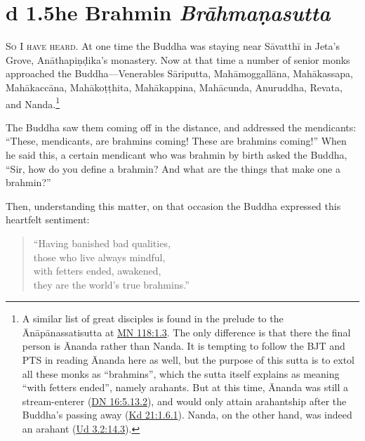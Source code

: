 \documentclass[12pt,openany]{book}%
\newcommand*{\suttatitleacronym}[1]{\smaller[2]{#1}\vspace*{.3em}}
\newcommand*{\suttatitletranslation}[1]{\linebreak{#1}}
\newcommand*{\suttatitleroot}[1]{\linebreak\smaller[2]\itshape{#1}}
\newcommand*{\tocacronym}[1]{\hspace*{-3.3em}{#1}\quad}
\newcommand*{\toctranslation}[1]{#1}
\newcommand*{\tocroot}[1]{(\textit{#1})}
\newcommand*{\scevam}[1]{\textsc{#1}}
\begin{document}
%
\section*{{\suttatitleacronym Ud 1.5}{\suttatitletranslation The Brahmin }{\suttatitleroot Brāhmaṇasutta}}
\addcontentsline{toc}{section}{\tocacronym{Ud 1.5} \toctranslation{The Brahmin } \tocroot{Brāhmaṇasutta}}

\scevam{So I have heard. }At one time the Buddha was staying near \textsanskrit{Sāvatthī} in Jeta’s Grove, \textsanskrit{Anāthapiṇḍika}’s monastery. Now at that time a number of senior monks approached the Buddha—Venerables \textsanskrit{Sāriputta}, \textsanskrit{Mahāmoggallāna}, \textsanskrit{Mahākassapa}, \textsanskrit{Mahākaccāna}, \textsanskrit{Mahākoṭṭhita}, \textsanskrit{Mahākappina}, \textsanskrit{Mahācunda}, Anuruddha, Revata, and Nanda.\footnote{A similar list of great disciples is found in the prelude to the \textsanskrit{Ānāpānassatisutta} at \href{https://suttacentral.net/mn118/en/sujato\#1.3}{MN 118:1.3}. The only difference is that there the final person is Ānanda rather than Nanda. It is tempting to follow the BJT and PTS in reading Ānanda here as well, but the purpose of this sutta is to extol all these monks as “brahmins”, which the sutta itself explains as meaning “with fetters ended”, namely arahants. But at this time, Ānanda was still a stream-enterer (\href{https://suttacentral.net/dn16/en/sujato\#5.13.2}{DN 16:5.13.2}), and would only attain arahantship after the Buddha’s passing away (\href{https://suttacentral.net/pli-tv-kd21/en/sujato\#1.6.1}{Kd 21:1.6.1}). Nanda, on the other hand, was indeed an arahant (\href{https://suttacentral.net/ud3.2/en/sujato\#14.3}{Ud 3.2:14.3}). } 

The Buddha saw them coming off in the distance, and addressed the mendicants: “These, mendicants, are brahmins coming! These are brahmins coming!” When he said this, a certain mendicant who was brahmin by birth asked the Buddha, “Sir, how do you define a brahmin? And what are the things that make one a brahmin?” 

Then, understanding this matter, on that occasion the Buddha expressed this heartfelt sentiment: 

\begin{verse}%
“Having banished bad qualities, \\
those who live always mindful, \\
with fetters ended, awakened, \\
they are the world’s true brahmins.” 

%
\end{verse}
\end{document}
